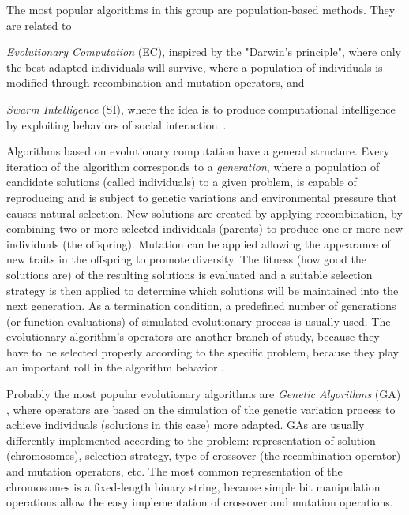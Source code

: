 The most popular algorithms in this group are population-based methods. They are related to \begin{inparaenum}[i)] \item \textit{Evolutionary Computation} (EC), inspired by the "Darwin's principle", where only the best adapted individuals will survive, where a population of individuals is modified through recombination and mutation operators, and \item \textit{Swarm Intelligence} (SI), where the idea is to produce computational intelligence by exploiting behaviors of social interaction~\cite{Boussaid2013}.\end{inparaenum} 

Algorithms based on evolutionary computation have a general structure. Every iteration of the algorithm corresponds to a \textit{generation}, where a population of candidate solutions (called individuals) to a given problem, is capable of reproducing and is subject to genetic variations and environmental pressure that causes natural selection. New solutions are created by applying recombination, by combining two or more selected individuals (parents) to produce one or more new individuals (the offspring). Mutation can be applied allowing the appearance of new traits in the offspring to promote diversity. The fitness (how good the solutions are) of the resulting solutions is evaluated and a suitable selection strategy is then applied to determine which solutions will be maintained into the next generation. As a termination condition, a predefined number of generations (or function evaluations) of simulated evolutionary process is usually used. The evolutionary algorithm's operators are another branch of study, because they have to be selected properly according to the specific problem, because they play an important roll in the algorithm behavior \cite{Maturana2012}.

Probably the most popular evolutionary algorithms are {\it Genetic Algorithms} (GA) \cite{Reeves2010}, where operators are based on the simulation of the genetic variation  process to achieve individuals (solutions in this case) more adapted. GAs are usually differently implemented according to the problem: representation of solution (chromosomes), selection strategy, type of crossover (the recombination operator) and mutation operators, etc. The most common representation of the chromosomes is a fixed-length binary string, because simple bit manipulation operations allow the easy implementation of crossover and mutation operations.

